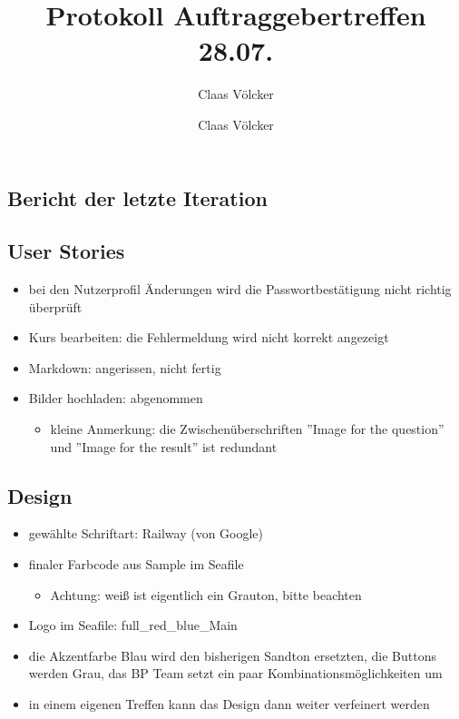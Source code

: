 \documentclass[colorback, accentcolor=tud1c, paper=a4]{tudexercise}
\title{Protokoll Auftraggebertreffen 28.07.}
\subtitle{Claas Völcker}
\author{Claas Völcker}
\begin{document}
\maketitle

\begin{multicols}{2}

\section*{Bericht der letzte Iteration}
\subsection*{User Stories}
\begin{itemize}
	\item bei den Nutzerprofil Änderungen wird die Passwortbestätigung nicht richtig überprüft
	\item Kurs bearbeiten: die Fehlermeldung wird nicht korrekt angezeigt
	\item Markdown: angerissen, nicht fertig
	\item Bilder hochladen: abgenommen
	\begin{itemize}
		\item kleine Anmerkung: die Zwischenüberschriften ''Image for the question'' und ''Image for the result'' ist redundant
	\end{itemize}
\end{itemize}

\subsection*{Design}
\begin{itemize}
	\item gewählte Schriftart: Railway (von Google)
	\item finaler Farbcode aus Sample im Seafile
	\begin{itemize}
		\item Achtung: weiß ist eigentlich ein Grauton, bitte beachten
	\end{itemize}
	\item Logo im Seafile: full\_red\_blue\_Main
	\item die Akzentfarbe Blau wird den bisherigen Sandton ersetzten, die Buttons werden Grau, das BP Team setzt ein paar Kombinationsmöglichkeiten um
	\item in einem eigenen Treffen kann das Design dann weiter verfeinert werden
\end{itemize}


\end{multicols}
\end{document}
